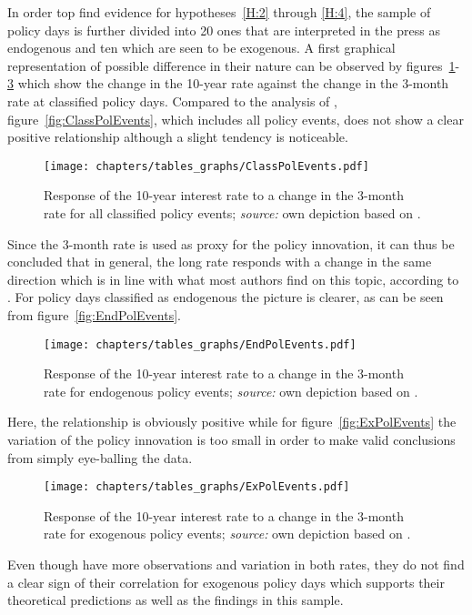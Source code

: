 In order top find evidence for hypotheses~\ref{H:2} through \ref{H:4}, the sample of policy days is further divided into 20 ones that are interpreted in the press as endogenous and ten which are seen to be exogenous. A first graphical representation of possible difference in their nature can be observed by figures~\ref{fig:ClassPolEvents}-\ref{fig:ExPolEvents} which show the change in the 10-year rate against the change in the 3-month rate at classified policy days. Compared to the analysis of \textcite{Ellingsen.2003}, figure~\vref{fig:ClassPolEvents}, which includes all policy events, does not show a clear positive relationship although a slight tendency is noticeable. 
\begin{figure}[htbp]
	\centering
	\texttt{[image: chapters/tables\_graphs/ClassPolEvents.pdf]} 
	\caption[Response of the 10-year interest rate to a change in the 3-month rate for all classified policy events.]{Response of the 10-year interest rate to a change in the 3-month rate for all classified policy events; \textit{source:} own depiction based on \textcite{Ellingsen.2003}.}
	\label{fig:ClassPolEvents}
\end{figure}
%
Since the 3-month rate is used as proxy for the policy innovation, it can thus be concluded that in general, the long rate responds with a change in the same direction which is in line with what most authors find on this topic, according to \textcite{Ellingsen.2003}. For policy days classified as endogenous the picture is clearer, as can be seen from figure~\vref{fig:EndPolEvents}.
\begin{figure}[htbp]
	\centering
	\texttt{[image: chapters/tables\_graphs/EndPolEvents.pdf]} 
	\caption[Response of the 10-year interest rate to a change in the 3-month rate for endogenous policy events.]{Response of the 10-year interest rate to a change in the 3-month rate for endogenous policy events; \textit{source:} own depiction based on \textcite{Ellingsen.2003}.}
	\label{fig:EndPolEvents}
\end{figure}
%
Here, the relationship is obviously positive while for figure~\vref{fig:ExPolEvents} the variation of the policy innovation is too small in order to make valid conclusions from simply eye-balling the data.
\begin{figure}[htbp]
	\centering
	\texttt{[image: chapters/tables\_graphs/ExPolEvents.pdf]} 
	\caption[Response of the 10-year interest rate to a change in the 3-month rate for exogenous policy events]{Response of the 10-year interest rate to a change in the 3-month rate for exogenous policy events; \textit{source:} own depiction based on \textcite{Ellingsen.2003}.}
	\label{fig:ExPolEvents}
\end{figure}
%
Even though \textcite{Ellingsen.2003} have more observations and variation in both rates, they do not find a clear sign of their correlation for exogenous policy days which supports their theoretical predictions as well as the findings in this sample. 

